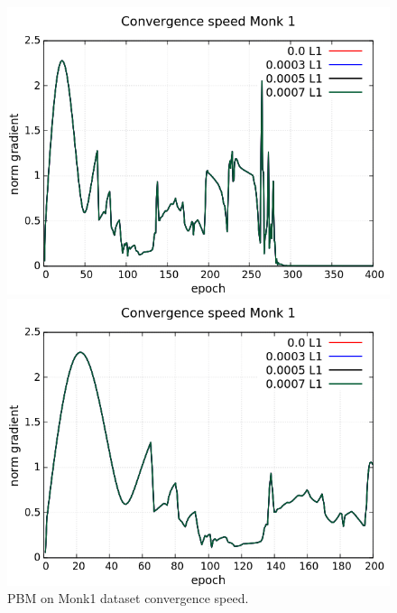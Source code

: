 \begin{figure}[H]
	\centering
	\begin{minipage}[t]{0.5\linewidth}
		\includegraphics[width=\linewidth]{data/PBM/Monk1/Monk1_PBM_CS_standard.png}
	\end{minipage}%
	\begin{minipage}[t]{0.5\linewidth}
		\includegraphics[width=\linewidth]{data/PBM/Monk1/Monk1_PBM_CS_zoom.png}
	\end{minipage}
	\caption{PBM on Monk1 dataset convergence speed.}
\end{figure}

